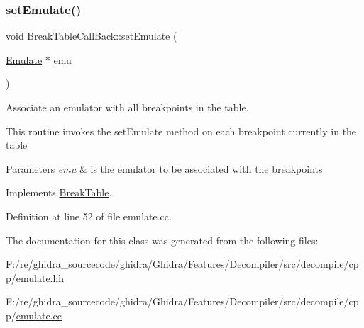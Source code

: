 \subsubsection{\texorpdfstring{setEmulate()}{setEmulate()}}
{\footnotesize\ttfamily void Break\+Table\+Call\+Back\+::set\+Emulate (\begin{DoxyParamCaption}\item[{\mbox{\hyperlink{class_emulate}{Emulate}} $\ast$}]{emu }\end{DoxyParamCaption})\hspace{0.3cm}{\ttfamily [virtual]}}



Associate an emulator with all breakpoints in the table. 

This routine invokes the set\+Emulate method on each breakpoint currently in the table 
\begin{DoxyParams}{Parameters}
{\em emu} & is the emulator to be associated with the breakpoints \\
\hline
\end{DoxyParams}


Implements \mbox{\hyperlink{class_break_table_a7efdfc549d576cf17235aa74bbf19a79}{Break\+Table}}.



Definition at line 52 of file emulate.\+cc.



The documentation for this class was generated from the following files\+:\begin{DoxyCompactItemize}
\item 
F\+:/re/ghidra\+\_\+sourcecode/ghidra/\+Ghidra/\+Features/\+Decompiler/src/decompile/cpp/\mbox{\hyperlink{emulate_8hh}{emulate.\+hh}}\item 
F\+:/re/ghidra\+\_\+sourcecode/ghidra/\+Ghidra/\+Features/\+Decompiler/src/decompile/cpp/\mbox{\hyperlink{emulate_8cc}{emulate.\+cc}}\end{DoxyCompactItemize}

